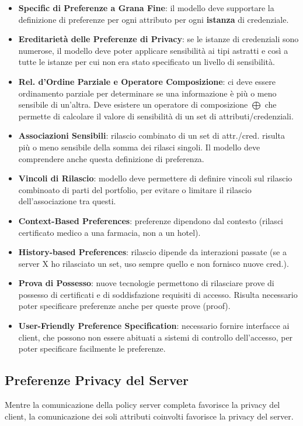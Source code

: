 \begin{itemize}
    \item \textbf{Specific di Preferenze a Grana Fine}: il modello deve supportare la definizione di preferenze per ogni attributo per ogni \textbf{istanza} di credenziale.
    \item \textbf{Ereditarietà delle Preferenze di Privacy}: se le istanze di credenziali sono numerose, il modello deve poter applicare sensibilità ai tipi astratti e così a tutte le istanze per cui non era stato specificato un livello di sensibilità.
    \item \textbf{Rel. d'Ordine Parziale e Operatore Composizione}: ci deve essere ordinamento parziale per determinare se una informazione è più o meno sensibile di un'altra. Deve esistere un operatore di composizione $\bigoplus$ che permette di calcolare il valore di sensibilità di un set di attributi/credenziali.
    \item \textbf{Associazioni Sensibili}: rilascio combinato di un set di attr./cred. risulta più o meno sensibile della somma dei rilasci singoli. Il modello deve comprendere anche questa definizione di preferenza.
    \item \textbf{Vincoli di Rilascio}: modello deve permettere di definire vincoli sul rilascio combinoato di parti del portfolio, per evitare o limitare il rilascio dell'associazione tra questi.
    \item \textbf{Context-Based Preferences}: preferenze dipendono dal contesto (rilasci certificato medico a una farmacia, non a un hotel).
    \item \textbf{History-based Preferences}: rilascio dipende da interazioni passate (se a server X ho rilasciato un set, uso sempre quello e non fornisco nuove cred.).
    \item \textbf{Prova di Possesso}: nuove tecnologie permettono di rilasciare prove di possesso di certificati e di soddisfazione requisiti di accesso. Risulta necessario poter specificare preferenze anche per queste prove (proof).
    \item \textbf{User-Friendly Preference Specification}: necessario fornire interfacce ai client, che possono non essere abituati a sistemi di controllo dell'accesso, per poter specificare facilmente le preferenze.
\end{itemize}




\subsection{Preferenze Privacy del Server}
Mentre la comunicazione della policy server completa favorisce la privacy del client, la comunicazione dei soli attributi coinvolti favorisce la privacy del server.

